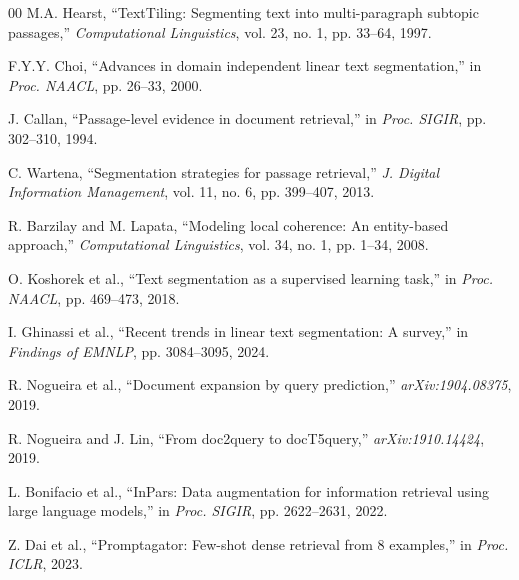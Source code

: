 \documentclass[conference]{IEEEtran}
\begin{document}
\begin{thebibliography}{00}
 M.A. Hearst, ``TextTiling: Segmenting text into multi-paragraph subtopic passages,'' \textit{Computational Linguistics}, vol. 23, no. 1, pp. 33--64, 1997.

 F.Y.Y. Choi, ``Advances in domain independent linear text segmentation,'' in \textit{Proc. NAACL}, pp. 26--33, 2000.

 J. Callan, ``Passage-level evidence in document retrieval,'' in \textit{Proc. SIGIR}, pp. 302--310, 1994.

 C. Wartena, ``Segmentation strategies for passage retrieval,'' \textit{J. Digital Information Management}, vol. 11, no. 6, pp. 399--407, 2013.

 R. Barzilay and M. Lapata, ``Modeling local coherence: An entity-based approach,'' \textit{Computational Linguistics}, vol. 34, no. 1, pp. 1--34, 2008.

 O. Koshorek et al., ``Text segmentation as a supervised learning task,'' in \textit{Proc. NAACL}, pp. 469--473, 2018.

 I. Ghinassi et al., ``Recent trends in linear text segmentation: A survey,'' in \textit{Findings of EMNLP}, pp. 3084--3095, 2024.

 R. Nogueira et al., ``Document expansion by query prediction,'' \textit{arXiv:1904.08375}, 2019.

 R. Nogueira and J. Lin, ``From doc2query to docT5query,'' \textit{arXiv:1910.14424}, 2019.

 L. Bonifacio et al., ``InPars: Data augmentation for information retrieval using large language models,'' in \textit{Proc. SIGIR}, pp. 2622--2631, 2022.

 Z. Dai et al., ``Promptagator: Few-shot dense retrieval from 8 examples,'' in \textit{Proc. ICLR}, 2023.
\end{thebibliography}
\end{document}
